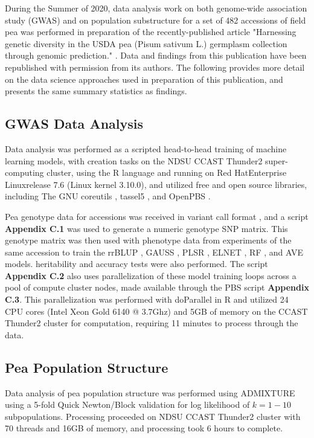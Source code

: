 \documentclass[12pt, letterpaper,oneocolumn]{article}
\begin{document}
	During the Summer of 2020, data analysis work on both genome-wide association study (GWAS) and on population substructure for a set of 482 accessions of field pea was performed in preparation of the recently-published article "Harnessing genetic diversity in the USDA pea (Pisum sativum L.) germplasm collection through genomic prediction." \cite{pea_diversity}. Data and findings from this publication have been republished with permission from its authors. The following provides more detail on the data science approaches used in preparation of this publication, and presents the same summary statistics as findings.

	\subsection{GWAS Data Analysis}
	Data analysis was performed as a scripted head-to-head training of machine learning models, with creation tasks on the NDSU CCAST Thunder2 super-computing cluster, using the R language \cite{R-lang} and running on Red Hat\textregistered Enterprise Linux\textregistered release 7.6 (Linux kernel 3.10.0), and utilized free and open source libraries, including The GNU coreutils \cite{GNU}, tassel5 \cite{tassel5}, and OpenPBS \cite{OpenPBS}.

	Pea genotype data for accessions was received in variant call format \cite{vcf}, and a script \textbf{Appendix C.1} was used to generate a numeric genotype SNP matrix. This genotype matrix was then used with phenotype data from experiments of the same accession to train the rrBLUP \cite{rrBLUP}, GAUSS \cite{GAUSS}, PLSR \cite{pls}, ELNET \cite{glmnet}, RF \cite{RF}, and AVE \cite{BGLR} models. heritability and accuracy tests were also performed. The script \textbf{Appendix C.2} also uses parallelization of these model training loops across a pool of compute cluster nodes, made available through the PBS script \textbf{Appendix C.3}. This parallelization was performed with doParallel in R \cite{doparallel} and utilized 24 CPU cores (Intel \textregistered Xeon \textregistered Gold 6140 @ 3.7Ghz) and 5GB of memory on the CCAST Thunder2 cluster for computation, requiring 11 minutes to process through the data.

	\subsection{Pea Population Structure}
	Data analysis of pea population structure was performed using ADMIXTURE \cite{admixture} using a 5-fold Quick Newton/Block validation for log likelihood of $k={1-10}$ subpopulations. Processing proceeded on NDSU CCAST Thunder2 cluster with 70 threads and 16GB of memory, and processing took 6 hours to complete.
\end{document}

